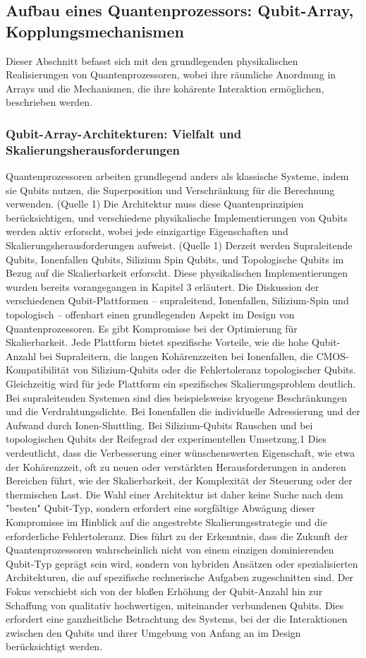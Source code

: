 \subsection{Aufbau eines Quantenprozessors: Qubit-Array, Kopplungsmechanismen}
Dieser Abschnitt befasst sich mit den grundlegenden physikalischen Realisierungen von Quantenprozessoren, wobei ihre räumliche Anordnung in Arrays und die  Mechanismen, die ihre kohärente Interaktion ermöglichen, beschrieben werden.
\subsubsection{Qubit-Array-Architekturen: Vielfalt und Skalierungsherausforderungen}
Quantenprozessoren arbeiten grundlegend anders als klassische Systeme, indem sie Qubits nutzen, die Superposition und Verschränkung für die Berechnung verwenden. (Quelle 1) Die Architektur muss diese Quantenprinzipien berücksichtigen, und verschiedene physikalische Implementierungen von Qubits werden aktiv erforscht, wobei jede einzigartige Eigenschaften und Skalierungsherausforderungen aufweist. (Quelle 1)
Derzeit werden Supraleitende Qubits, Ionenfallen Qubits, Silizium Spin Qubits, und Topologische Qubits im Bezug auf die Skalierbarkeit erforscht. Diese physikalischen Implementierungen wurden bereits vorangegangen in Kapitel 3 erläutert. Die Diskussion der verschiedenen Qubit-Plattformen – supraleitend, Ionenfallen, Silizium-Spin und topologisch – offenbart einen grundlegenden Aspekt im Design von Quantenprozessoren. Es gibt Kompromisse bei der Optimierung für Skalierbarkeit. Jede Plattform bietet spezifische Vorteile, wie die hohe Qubit-Anzahl bei Supraleitern, die langen Kohärenzzeiten bei Ionenfallen, die CMOS-Kompatibilität von Silizium-Qubits oder die  Fehlertoleranz topologischer Qubits. Gleichzeitig wird für jede Plattform ein spezifisches Skalierungsproblem deutlich. Bei supraleitenden Systemen sind dies beispielsweise kryogene Beschränkungen und die Verdrahtungsdichte. Bei Ionenfallen die individuelle Adressierung und der Aufwand durch Ionen-Shuttling. Bei Silizium-Qubits Rauschen und bei topologischen Qubits der Reifegrad der experimentellen Umsetzung.1 Dies verdeutlicht, dass die Verbesserung einer wünschenswerten Eigenschaft, wie etwa der Kohärenzzeit, oft zu neuen oder verstärkten Herausforderungen in anderen Bereichen führt, wie der Skalierbarkeit, der Komplexität der Steuerung oder der thermischen Last. Die Wahl einer Architektur ist daher keine Suche nach dem "besten" Qubit-Typ, sondern erfordert eine sorgfältige Abwägung dieser Kompromisse im Hinblick auf die angestrebte Skalierungsstrategie und die erforderliche Fehlertoleranz. Dies führt zu der Erkenntnis, dass die Zukunft der Quantenprozessoren wahrscheinlich nicht von einem einzigen dominierenden Qubit-Typ geprägt sein wird, sondern von hybriden Ansätzen oder spezialisierten Architekturen, die auf spezifische rechnerische Aufgaben zugeschnitten sind. Der Fokus verschiebt sich von der bloßen Erhöhung der Qubit-Anzahl hin zur Schaffung von qualitativ hochwertigen, miteinander verbundenen Qubits. Dies erfordert eine ganzheitliche Betrachtung des Systems, bei der die Interaktionen zwischen den Qubits und ihrer Umgebung von Anfang an im Design berücksichtigt werden.
